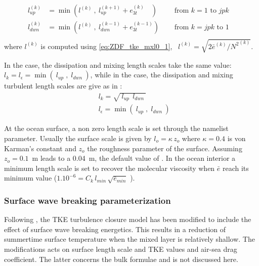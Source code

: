 \documentclass[../main/NEMO_manual]{subfiles}
\begin{document}
\[
  \begin{aligned}
    l_{up\ \ }^{(k)} &= \min \left(  l^{(k)} \ , \ l_{up}^{(k+1)} + e_{3t}^{(k)}\ \ \ \;  \right)
    \quad &\text{ from $k=1$ to $jpk$ }\ \\
    l_{dwn}^{(k)} &= \min \left(  l^{(k)} \ , \ l_{dwn}^{(k-1)} + e_{3t}^{(k-1)}  \right)
    \quad &\text{ from $k=jpk$ to $1$ }\ \\
  \end{aligned}
\]
where $l^{(k)}$ is computed using \autoref{eq:ZDF_tke_mxl0_1}, \ie\ $l^{(k)} = \sqrt {2 {\bar e}^{(k)} / {N^2}^{(k)} }$.

In the  case, the dissipation and mixing length scales take the same value:
$ l_k=  l_\epsilon = \min \left(\ l_{up} \;,\;  l_{dwn}\ \right)$, while in the  case,
the dissipation and mixing turbulent length scales are give as in \citet{gaspar.gregoris.ea_JGR90}:
\[
  \begin{aligned}
    & l_k          = \sqrt{\  l_{up} \ \ l_{dwn}\ }  	\\
    & l_\epsilon = \min \left(\ l_{up} \;,\;  l_{dwn}\ \right)
  \end{aligned}
\]

At the ocean surface, a non zero length scale is set through the   namelist parameter.
Usually the surface scale is given by $l_o = \kappa \,z_o$ where $\kappa = 0.4$ is von Karman's constant and
$z_o$ the roughness parameter of the surface.
Assuming $z_o=0.1$~m \citep{craig.banner_JPO94} leads to a 0.04~m, the default value of .
In the ocean interior a minimum length scale is set to recover the molecular viscosity when
$\bar{e}$ reach its minimum value ($1.10^{-6}= C_k\, l_{min} \,\sqrt{\bar{e}_{min}}$ ).

\subsubsection{Surface wave breaking parameterization}

Following \citet{mellor.blumberg_JPO04}, the TKE turbulence closure model has been modified to
include the effect of surface wave breaking energetics.
This results in a reduction of summertime surface temperature when the mixed layer is relatively shallow.
The \citet{mellor.blumberg_JPO04} modifications acts on surface length scale and TKE values and
air-sea drag coefficient.
The latter concerns the bulk formulae and is not discussed here.
\end{document}
